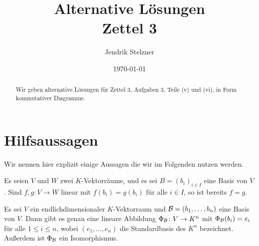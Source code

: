 \documentclass[a4paper,10pt]{article}
\title{Alternative Lösungen \\ Zettel 3}
\author{Jendrik Stelzner}
\date{\today}
\begin{document}
\maketitle










\begin{abstract}
  Wir geben alternative Lösungen für Zettel 3, Aufgaben 3, Teile (v) und (vi), in Form kommutativer Diagramme.
\end{abstract}










\section{Hilfsaussagen}

Wir nennen hier explizit einige Aussagen die wir im Folgenden nutzen werden.

\begin{lemma}
  Es seien $V$ und $W$ zwei $K$-Vektorräume, und es sei $B = (b_i)_{i \in I}$ eine Basis von $V$.
  Sind $f, g \colon V \to W$ linear mit $f(b_i) = g(b_i)$ für alle $i \in I$, so ist bereits $f = g$.
\end{lemma}


\begin{lemma}
  Es sei $V$ ein endlichdimensionaler $K$-Vektorraum und $\mathcal{B} = (b_1, \dotsc, b_n)$ eine Basis von $V$.
  Dann gibt es genau eine lineare Abbildung $\Phi_{\mathcal{B}} \colon V \to K^n$ mit $\Phi_{\mathcal{B}}(b_i) = e_i$ für alle $1 \leq i \leq n$, wobei $(e_1, \dotsc, e_n)$ die Standardbasis des $K^n$ bezeichnet.
  Außerdem ist $\Phi_{\mathcal{B}}$ ein Isomorphismus.
\end{lemma}
\end{document}
